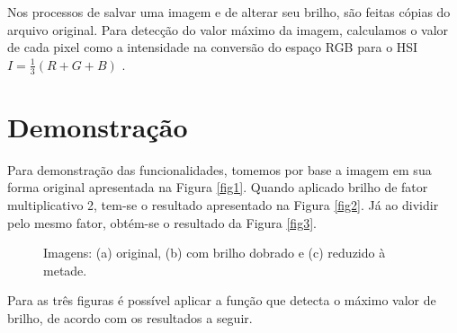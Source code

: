 \documentclass[a4paper, 10pt, conference]{ieeeconf}
\begin{document}
Nos processos de salvar uma imagem e de alterar seu brilho, são feitas cópias do arquivo original. Para detecção do valor máximo da imagem, calculamos o valor de cada pixel como a intensidade na conversão do espaço RGB para o HSI $I=\frac{1}{3}(R+G+B)$ \cite{rgb}.

\section{Demonstração}


Para demonstração das funcionalidades, tomemos por base a imagem em sua forma original apresentada na Figura \ref{fig1}. Quando aplicado brilho de fator multiplicativo 2, tem-se o resultado apresentado na Figura \ref{fig2}. Já ao dividir pelo mesmo fator, obtém-se o resultado da Figura \ref{fig3}.

\begin{figure}[h]
	\centering
	\hspace{0.05cm}
	\hspace{0.05cm}
	\caption{Imagens: (a) original, (b) com brilho dobrado e (c) reduzido à metade.}
	\label{comp}
\end{figure}

Para as três figuras é possível aplicar a função que detecta o máximo valor de brilho, de acordo com os resultados a seguir.
\end{document}
